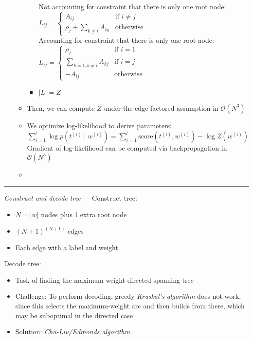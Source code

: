 \begin{itemize}
\begin{itemize}
\begin{itemize}
            Not accounting for constraint that there is only one root node:
            $L_{ij} =
            \begin{cases}
                A_{ij} & \text{if } i \neq j \\
                \rho_j + \sum_{k \neq i} A_{kj} & \text{otherwise}
            \end{cases}$\\
            Accounting for constraint that there is only one root node:
            $L_{ij} =
            \begin{cases}
                \rho_j & \text{if } i = 1 \\
                \sum_{k=1,k \neq i} A_{kj} & \text{if } i = j \\
                -A_{ij} & \text{otherwise}
            \end{cases}$
            \item $|L| = Z$
        \end{itemize}
        \item Then, we can compute $Z$ under the edge factored assumption in $\mathcal{O}(N^3)$
        \item We optimize log-likelihood to derive parameters:
        $
        \sum_{i=1}^l \log p(t^{(i)} \mid w^{(i)}) = \sum_{i=1}^l \textrm{score}(t^{(i)}, w^{(i)}) - \log Z(w^{(i)})
        $ Gradient of log-likelihood can be computed via backpropagation in $\mathcal{O}(N^3)$
        \item 
    \end{itemize}
\end{itemize}

{\color{lightgrey}\hrule height 0.001mm}

\emph{Construct and decode tree} ---
Construct tree:
\begin{itemize}
    \item $N = |w|$ nodes plus 1 extra root node
    \item $(N+1)^{(N+1)}$ edges
    \item Each edge with a label and weight
\end{itemize}

Decode tree:
\begin{itemize}
    \item Task of finding the maximum-weight directed spanning tree
    \item Challenge: To perform decoding, greedy \emph{Kruskal's algorithm} does not work, since this selects the maximum-weight arc and then builds from there, which may be suboptimal in the directed case
    \item Solution: \emph{Chu-Liu/Edmonds algorithm}
\end{itemize}

